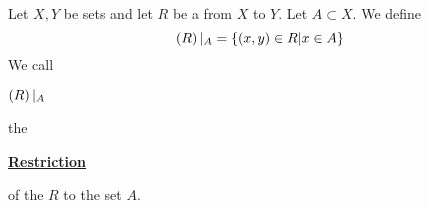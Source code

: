 \newcommand{\Restriction}[0]{
    \textbf{\hyperref[def:FunctionRestriction]{Restriction}}
}
\newcommand{\scRestriction}[2]{
    \ensuremath{\pa{#1}|_{#2}}
}\begin{df}[Restriction]
\label{def:FunctionRestriction}

\rm
    Let $X,Y$ be sets and 
    let $R$ be a 
    \Relation from 
    $X$ to $Y$. 
    Let $A \subset X$. 
    We define 
    \begin{equation*}
        \scRestriction{R}{A} = \{(x,y)\in R| x \in A \}
    \end{equation*}
    We call 
    \scRestriction{R}{A}
    the 
    \Restriction 
    of the \Relation
    $R$
    to the set 
    $A$. 
\end{df}
